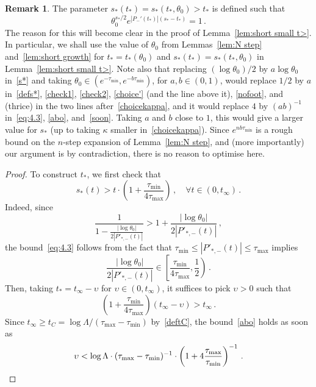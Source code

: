\documentclass[10pt]{amsart}
\theoremstyle{definition}\newtheorem{defi}[theo]{Definition}\newtheorem{rema}[theo]{Remark}\newtheorem{exam}[theo]{Example}\newtheorem{exem}[theo]{Example}\newtheorem{nota}[theo]{Notation}
\let\oldforall\forall
\renewcommand*{\forall}{\mathrel{\oldforall}}
\begin{document}
\begin{rema}\label{choice}
The parameter $s_*(t_*)=s_*(t_*,\theta_0) > t_*$ is defined such that
\begin{equation}\label{defs*}
\theta_0^{s_*/2} e^{\left|P_-'(t_*)\right|\left(s_* - t_*\right)} = 1 \,.
\end{equation}
The reason for this will become clear in the proof of Lemma~\ref{lem:short small t>}. In particular, we shall use the value of $\theta_0$ from Lemmas~\ref{lem:N step} and~\ref{lem:short growth} for $t_*=t_*(\theta_0)$ and $s_*(t_*)=s_*(t_*,\theta_0)$ in Lemma~\ref{lem:short small t>}. Note also that replacing $(\log \theta_0)/2$ by $a \log \theta_0$ in~\eqref{s*} and taking $\theta_0\in (e^{- \tau_{\min}},e^{- b\tau_{\min}})$, for $a, b \in (0,1)$, would replace $1/2$ by $a$ in~\eqref{defs*}, \eqref{check1}, \eqref{check2}, \eqref{choice'} (and the line above it), \eqref{nofoot}, and (thrice) in the two lines after~\eqref{choicekappa}, and it would replace $4$ by $(ab)^{-1}$ in~\eqref{eq:4.3}, \eqref{abo}, and~\eqref{soon}. Taking $a$ and $b$ close to $1$, this would give a larger value for $s_*$ (up to taking $\kappa$ smaller in~\eqref{choicekappa}). Since $e^{n b\tau_{\min}}$ is a rough bound on the $n$-step expansion of Lemma~\ref{lem:N step}, and (more importantly) our argument is by contradiction, there is no reason to optimise here.
\end{rema}


\begin{proof}
To construct $t_*$, we first check that
\begin{equation}\label{eq:4.3}
s_*(t)>t \cdot \left(1+ \frac{\tau_{\min}}{4\tau_{\max}} \right)\, , \quad 
\forall t\in (0 , t_\infty)
\, .
\end{equation}
Indeed, since
\begin{equation}\label{check1}
\frac 1{1-\frac{|\log \theta_0|}{2| P'_{*,-}(t)|}} > 1+\frac{|\log \theta_0|}{2| P'_{*,-}(t)|}\,,
\end{equation}
the bound~\eqref{eq:4.3} follows from the fact that $ \tau_{\min} \le | P'_{*,-}(t)|\le \tau_{\max}$ implies
\begin{equation}\label{check2}
\frac{|\log \theta_0 |}{2\left| P'_{*,-}(t)\right|}
\in \left[\frac{\tau_{\min}}{4\tau_{\max}},\frac 1 {2} \right)\,.
\end{equation}
Then, taking $t_*=t_\infty-\upsilon$ for $\upsilon \in (0,t_\infty)$, it suffices to pick $\upsilon>0$ such that
\begin{equation}\label{abo}
\left(1+ \frac{\tau_{\min}}{4\tau_{\max}} \right)\left(t_\infty-\upsilon \right) > t_\infty \,.
\end{equation}
Since $t_\infty \ge t_C=\log \Lambda/ (\tau_{\max}-\tau_{\min})$ by~\eqref{deftC}, the bound~\eqref{abo} holds as soon as
\begin{equation}\label{soon}
\upsilon < \log \Lambda \cdot (\tau_{\max}-\tau_{\min})^{-1}\cdot
\left(1+ 4\frac {\tau_{\max}}{\tau_{\min}}\right)^{-1} \,.\qedhere
\end{equation}
\end{proof}\let\qed\relax
\end{document}
